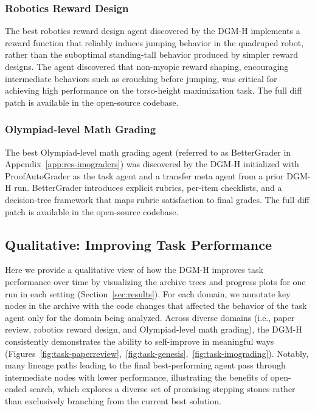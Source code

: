 \subsubsection{Robotics Reward Design}
\label{app:best-agents-genesis}

The best robotics reward design agent discovered by the DGM-H implements a reward function that reliably induces jumping behavior in the quadruped robot, rather than the suboptimal standing-tall behavior produced by simpler reward designs. The agent discovered that non-myopic reward shaping, encouraging intermediate behaviors such as crouching before jumping, was critical for achieving high performance on the torso-height maximization task. The full diff patch is available in the open-source codebase.

\subsubsection{Olympiad-level Math Grading}
\label{app:best-agents-imograding}

The best Olympiad-level math grading agent (referred to as BetterGrader in Appendix~\ref{app:res-imograders}) was discovered by the DGM-H initialized with ProofAutoGrader as the task agent and a transfer meta agent from a prior DGM-H run. BetterGrader introduces explicit rubrics, per-item checklists, and a decision-tree framework that maps rubric satisfaction to final grades. The full diff patch is available in the open-source codebase.

\subsection{Qualitative: Improving Task Performance}
\label{app:qual-task}

Here we provide a qualitative view of how the DGM-H improves task performance over time by visualizing the archive trees and progress plots for one run in each setting (Section~\ref{sec:results}). For each domain, we annotate key nodes in the archive with the code changes that affected the behavior of the task agent only for the domain being analyzed. Across diverse domains (i.e., paper review, robotics reward design, and Olympiad-level math grading), the DGM-H consistently demonstrates the ability to self-improve in meaningful ways (Figures~\ref{fig:task-paperreview},~\ref{fig:task-genesis},~\ref{fig:task-imograding}). Notably, many lineage paths leading to the final best-performing agent pass through intermediate nodes with lower performance, illustrating the benefits of open-ended search, which explores a diverse set of promising stepping stones rather than exclusively branching from the current best solution.

